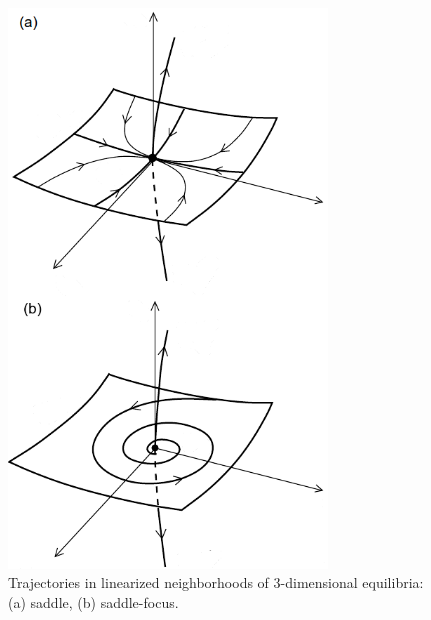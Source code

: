 \documentclass[../main.tex]{subfiles}
\begin{document}
\begin{figure}
\centering
\noindent \includegraphics[width=20pc]{gfx/eq_stability_3D.png}
\caption{Trajectories in linearized neighborhoods
of 3-dimensional equilibria: (a) saddle, (b) saddle-focus.}
\label{fig:ch2_03}
\end{figure}
\end{document}
